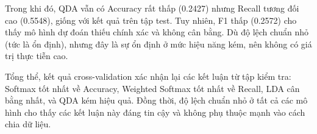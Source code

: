 Trong khi đó, QDA vẫn có Accuracy rất thấp (0.2427) nhưng Recall tương đối cao
(0.5548), giống với kết quả trên tập test. Tuy nhiên, F1 thấp (0.2572) cho thấy
mô hình dự đoán thiếu chính xác và không cân bằng. Dù độ lệch chuẩn nhỏ (tức là
ổn định), nhưng đây là sự ổn định ở mức hiệu năng kém, nên không có giá trị
thực tiễn cao.

Tổng thể, kết quả cross-validation xác nhận lại các kết luận từ tập kiểm tra:
Softmax tốt nhất về Accuracy, Weighted Softmax tốt nhất về Recall, LDA cân bằng
nhất, và QDA kém hiệu quả. Đồng thời, độ lệch chuẩn nhỏ ở tất cả các mô hình
cho thấy các kết luận này đáng tin cậy và không phụ thuộc mạnh vào cách chia dữ
liệu.
